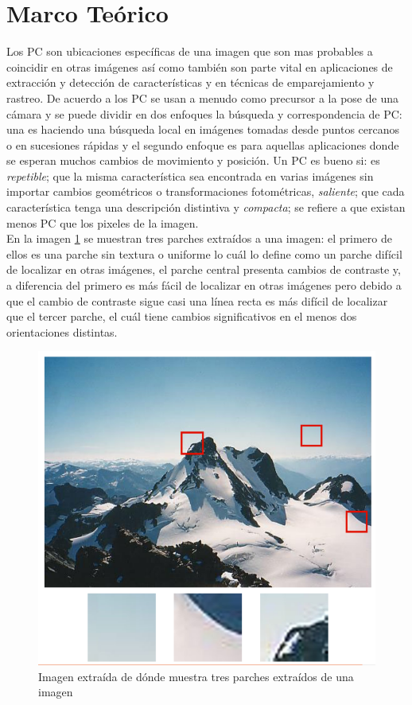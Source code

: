 \documentclass[]{report}
\begin{document}
\section{Marco Teórico}
Los PC son ubicaciones específicas de una imagen que son mas probables a coincidir en otras imágenes así como también son parte vital en aplicaciones de extracción y detección de características y en técnicas de emparejamiento y rastreo. De acuerdo a \cite{szeliski2010computer} los PC se usan a menudo como precursor a la pose de una cámara y se puede dividir en dos enfoques la búsqueda y correspondencia de PC: una es haciendo una búsqueda local en imágenes tomadas desde puntos cercanos o en sucesiones rápidas y el segundo enfoque es para aquellas aplicaciones donde se esperan muchos cambios de movimiento y posición. Un PC es bueno si: es \textit{repetible}; que la misma característica sea encontrada en varias imágenes sin importar cambios geométricos o transformaciones fotométricas, \textit{saliente}; que cada característica tenga una descripción distintiva y \textit{compacta}; se refiere a que existan menos PC que los pixeles de la imagen.\\
En la imagen \ref{fig:parches} se muestran tres parches extraídos a una imagen: el primero de ellos es una parche sin textura o uniforme lo cuál lo define como un parche difícil de localizar en otras imágenes, el parche central presenta cambios de contraste y, a diferencia del primero es más fácil de localizar en otras imágenes pero debido a que el cambio de contraste sigue casi una línea recta es más difícil de localizar que el tercer parche, el cuál tiene cambios significativos en el menos dos orientaciones distintas. \\

\begin{figure}[h]
\centering
\includegraphics[scale = 0.5]{parches.png}
\caption{Imagen extraída de \cite{szeliski2010computer} dónde muestra tres parches extraídos de una imagen}
\label{fig:parches}
\end{figure}
\end{document}
